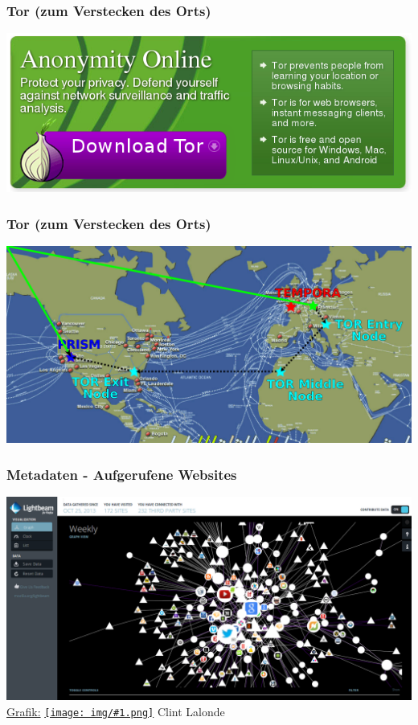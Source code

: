 \documentclass[12pt]{beamer}
\newcommand{\cc}[1]{\texttt{[image: img/\#1.png]}\hspace{1mm}}
\begin{document}
\begin{frame}
  \frametitle{Tor (zum Verstecken des Orts)}
  \begin{center}
    \includegraphics[height=0.5\textheight]{img/tor-banner.png}
  \end{center}
\end{frame}

\begin{frame}
  \frametitle{Tor (zum Verstecken des Orts)}
  \begin{center}
    \includegraphics[height=0.5\textheight]{img/internetmap-abhoeren-tor}
  \end{center}
\end{frame}

\begin{frame}
    \frametitle{Metadaten - Aufgerufene Websites}
    \begin{center}
      \includegraphics[height=0.7\textheight]{img/lightbeam.png}
      \\{\small \href{http://www.flickr.com/photos/8517757@N03/10538205035/in/photolist-h4e4dg}{Grafik:} \href{http://creativecommons.org/licenses/by-sa/3.0/deed.en}{\cc{by-sa}} Clint Lalonde}
    \end{center}
\end{frame}
\end{document}
